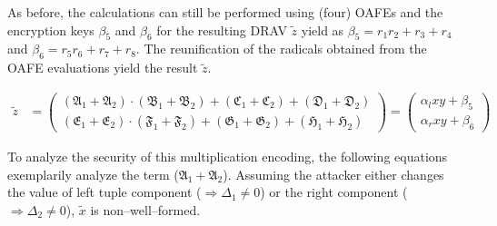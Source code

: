 \noindent{}As before, the calculations can still be performed using (four)
OAFEs and the encryption keys $\beta_5$ and $\beta_6$ for the resulting DRAV
$\widetilde{z}$ yield as $\beta_5 = r_1r_2 + r_3 + r_4$ and $\beta_6 = r_5r_6 +
r_7 + r_8$. The reunification of the radicals obtained from the OAFE evaluations
yield the result $\widetilde{z}$.

\begin{align*}
  \widetilde{z} & =
  \begin{pmatrix}%
    (\mathfrak{A}_1+\mathfrak{A}_2) \cdot
    (\mathfrak{B}_1+\mathfrak{B}_2) +
    (\mathfrak{C}_1+\mathfrak{C}_2) +
    (\mathfrak{D}_1+\mathfrak{D}_2)\\
    (\mathfrak{E}_1+\mathfrak{E}_2) \cdot
    (\mathfrak{F}_1+\mathfrak{F}_2) +
    (\mathfrak{G}_1+\mathfrak{G}_2) +
    (\mathfrak{H}_1+\mathfrak{H}_2)
  \end{pmatrix}
   =
   \begin{pmatrix}
     \alpha_l xy + \beta_5 \\
     \alpha_r xy + \beta_6
   \end{pmatrix}
\end{align*}

\noindent{}To analyze the security of this multiplication encoding, the
following equations exemplarily analyze the term ($\mathfrak{A}_1 +
\mathfrak{A}_2$). Assuming the attacker either changes the value of left tuple
component ($\Rightarrow \Delta_1 \neq 0$) or the right component ($\Rightarrow
\Delta_2 \neq 0$), $\widetilde{x}$ is non--well--formed.

